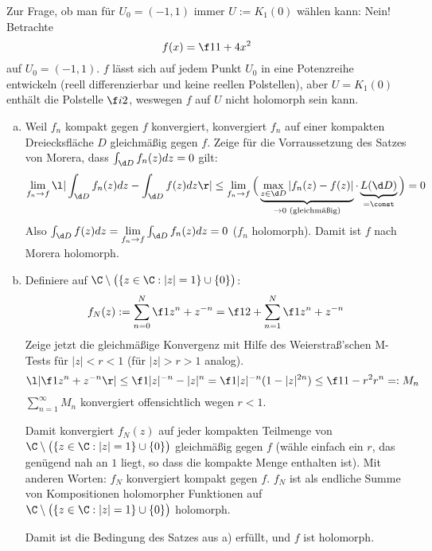 \documentclass{mywork}
\begin{document}
\begin{aufgabe}
		\newpage
		Zur Frage, ob man für $U_0 = (-1,1)$ immer $U:=K_1(0)$ wählen kann: 
		Nein! Betrachte
		\[
			f(x) = \f 1{1+4x^2}
		\]
		auf $U_0 = (-1,1)$.
		$f$ lässt sich auf jedem Punkt $U_0$ in eine Potenzreihe entwickeln (reell differenzierbar und keine reellen Polstellen), aber $U=K_1(0)$ enthält die Polstelle $\f i2$, weswegen $f$ auf $U$ nicht holomorph sein kann.
	\end{aufgabe}

	\begin{aufgabe}
		\begin{enumerate}[a)]
			\item
				Weil $f_n$ kompakt gegen $f$ konvergiert, konvergiert $f_n$ auf einer kompakten Dreiecksfläche $D$ gleichmäßig gegen $f$.
				Zeige für die Vorraussetzung des Satzes von Morera, dass $\int_{\d D}f_n(z)dz = 0$ gilt:
				\begin{align*}
					\lim_{f_n\to f} \l| \int_{\d D}f_n(z) dz - \int_{\d D}f(z) dz \r|
					\le \lim_{f_n \to f} \Big( \underbrace{\max_{z\in \d D}|f_n(z) - f(z)|}_{\to 0 \text{ (gleichmäßig)}} \cdot \underbrace{L(\d D)}_{=\const} \Big) = 0
				\end{align*}								
				Also $\int_{\d D}f(z) dz = \lim\limits_{f_n\to f} \int_{\d D}f_n(z) dz = 0$ ($f_n$ holomorph).
				Damit ist $f$ nach Morera holomorph.
			\item
				Definiere auf $\C\setminus \big(\{z\in \C : |z| = 1 \}\cup \{0\}\big)$:
				\[
					f_N(z) := \sum_{n=0}^N \f 1{z^n + z^{-n}} = \f 12 + \sum_{n=1}^N \f 1{z^n + z^{-n}}
				\]
				Zeige jetzt die gleichmäßige Konvergenz mit Hilfe des Weierstraß'schen M-Tests für $|z|< r <1$ (für $|z|>r >1$ analog).
				\[
					\l | \f 1{z^n+z^{-n}} \r| \le \f 1{|z|^{-n}-|z|^n} = \f 1{|z|^{-n}(1-|z|^{2n})} \le \f 1{1-r^2} r^n =: M_n
				\]
				$\sum_{n=1}^\infty M_n$ konvergiert offensichtlich wegen $r<1$.

				Damit konvergiert $f_N(z)$ auf jeder kompakten Teilmenge von $\C\setminus \big(\{z\in \C : |z| = 1 \}\cup \{0\}\big)$ gleichmäßig gegen $f$ (wähle einfach ein $r$, das genügend nah an $1$ liegt, so dass die kompakte Menge enthalten ist).
				Mit anderen Worten: $f_N$ konvergiert kompakt gegen $f$.
				$f_N$ ist als endliche Summe von Kompositionen holomorpher Funktionen auf $\C\setminus \big(\{z\in \C : |z| = 1 \}\cup \{0\}\big)$ holomorph.

				Damit ist die Bedingung des Satzes aus a) erfüllt, und $f$ ist holomorph.


\end{enumerate}
\end{aufgabe}
\end{document}

